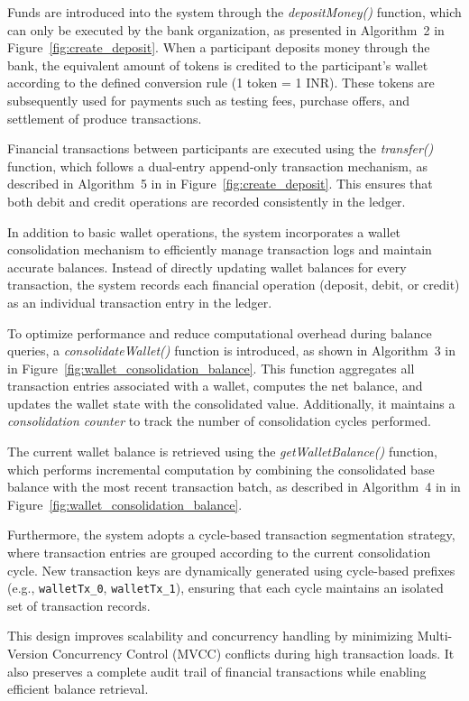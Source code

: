 \documentclass[12pt]{article}
\begin{document}
	Funds are introduced into the system through the \textit{depositMoney()} function, which can only be executed by the bank organization, as presented in Algorithm~2 in Figure~\ref{fig:create_deposit}. When a participant deposits money through the bank, the equivalent amount of tokens is credited to the participant's wallet according to the defined conversion rule (1 token = 1 INR). These tokens are subsequently used for payments such as testing fees, purchase offers, and settlement of produce transactions.
	
	Financial transactions between participants are executed using the \textit{transfer()} function, which follows a dual-entry append-only transaction mechanism, as described in Algorithm~5 in in Figure~\ref{fig:create_deposit}. This ensures that both debit and credit operations are recorded consistently in the ledger.
	
	In addition to basic wallet operations, the system incorporates a wallet consolidation mechanism to efficiently manage transaction logs and maintain accurate balances. Instead of directly updating wallet balances for every transaction, the system records each financial operation (deposit, debit, or credit) as an individual transaction entry in the ledger.
	
	To optimize performance and reduce computational overhead during balance queries, a \textit{consolidateWallet()} function is introduced, as shown in Algorithm~3 in in Figure~\ref{fig:wallet_consolidation_balance}. This function aggregates all transaction entries associated with a wallet, computes the net balance, and updates the wallet state with the consolidated value. Additionally, it maintains a \textit{consolidation counter} to track the number of consolidation cycles performed.
	
	The current wallet balance is retrieved using the \textit{getWalletBalance()} function, which performs incremental computation by combining the consolidated base balance with the most recent transaction batch, as described in Algorithm~4 in in Figure~\ref{fig:wallet_consolidation_balance}.
	
	Furthermore, the system adopts a cycle-based transaction segmentation strategy, where transaction entries are grouped according to the current consolidation cycle. New transaction keys are dynamically generated using cycle-based prefixes (e.g., \texttt{walletTx\_0}, \texttt{walletTx\_1}), ensuring that each cycle maintains an isolated set of transaction records.
	
	This design improves scalability and concurrency handling by minimizing Multi-Version Concurrency Control (MVCC) conflicts during high transaction loads. It also preserves a complete audit trail of financial transactions while enabling efficient balance retrieval.
	
\end{document}
